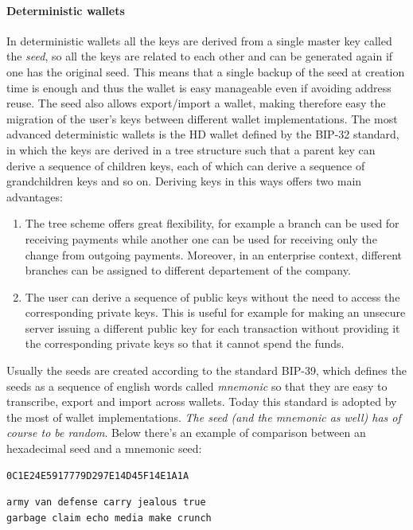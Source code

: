 \paragraph{Deterministic wallets} In deterministic wallets all the keys are
derived from a single master key called the \emph{seed}, so all the keys are
related to each other and can be generated again if one has the original seed.
This means that a single backup of the seed at creation time is enough and thus
the wallet is easy manageable even if avoiding address reuse. The seed also
allows export/import a wallet, making therefore easy the migration of the user's
keys between different wallet implementations. The most advanced deterministic
wallets is the HD wallet defined by the BIP-32 standard, in which the keys are
derived in a tree structure such that a parent key can derive a sequence of
children keys, each of which can derive a sequence of grandchildren keys and so
on. Deriving keys in this ways offers two main advantages:
\begin{enumerate}
  \item The tree scheme offers great flexibility, for example a branch can be used
  for receiving payments while another one can be used for receiving only
  the change from outgoing payments. Moreover, in an enterprise context, different
  branches can be assigned to different departement of the company.
  \item The user can derive a sequence of public keys without the need to access
  the corresponding private keys. This is useful for example for making an unsecure
  server issuing a different public key for each transaction without providing
  it the corresponding private keys so that it cannot spend the funds.
\end{enumerate}
Usually the seeds are created according to the standard BIP-39, which defines
the seeds as a sequence of english words called \emph{mnemonic} so that they are
easy to transcribe, export and import across wallets. Today this standard is adopted
by the most of wallet implementations. \emph{The seed (and the mnemonic as well) has
of course to be random}. Below there's an example of comparison between an
hexadecimal seed and a mnemonic seed:
\begin{lstlisting}[title=Hex seed for a deterministic wallet:]
0C1E24E5917779D297E14D45F14E1A1A
\end{lstlisting}
\begin{lstlisting}[title=12-word mnemonic seed for a deterministic wallet:]
army van defense carry jealous true
garbage claim echo media make crunch
\end{lstlisting}

